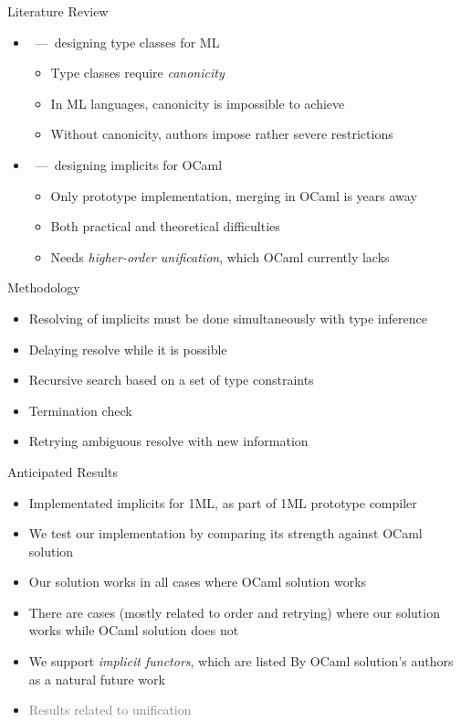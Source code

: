 \documentclass{beamer}
\begin{document}
\begin{frame}{Literature Review}
\begin{itemize}
    \item \cite{ml_typeclasses}~---~designing type classes for ML
    \begin{itemize}
        \item Type classes require \textit{canonicity}
        \item In ML languages, canonicity is impossible to achieve
        \item Without canonicity, authors impose rather severe restrictions
    \end{itemize}
    \item \cite{white}~---~designing implicits for OCaml
    \begin{itemize}
        \item Only prototype implementation, merging in OCaml is years away
        \item Both practical and theoretical difficulties
        \item Needs \textit{higher-order unification}, which OCaml currently lacks
    \end{itemize}
\end{itemize}
\end{frame}

\begin{frame}{Methodology}
\begin{itemize}
    \item Resolving of implicits must be done simultaneously with type inference
    \item Delaying resolve while it is possible
    \item Recursive search based on a set of type constraints
    \item Termination check
    \item Retrying ambiguous resolve with new information
\end{itemize}
\end{frame}

\begin{frame}{Anticipated Results}
\begin{itemize}
    \item Implementated implicits for 1ML, as part of 1ML prototype compiler
    \item We test our implementation by comparing its strength against OCaml solution
    \item Our solution works in all cases where OCaml solution works
    \item There are cases (mostly related to order and retrying) where our solution works while OCaml solution does not
    \item We support \textit{implicit functors}, which are listed By OCaml solution's authors as a natural future work  
    \item \textcolor{gray}{Results related to unification}
\end{itemize}
\end{frame}
\end{document}
